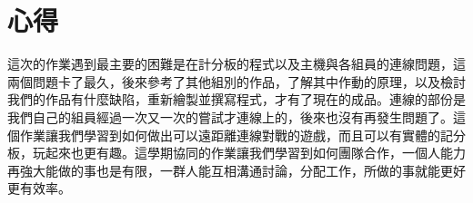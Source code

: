 \chapter{心得}
這次的作業遇到最主要的困難是在計分板的程式以及主機與各組員的連線問題，這兩個問題卡了最久，後來參考了其他組別的作品，了解其中作動的原理，以及檢討我們的作品有什麼缺陷，重新繪製並撰寫程式，才有了現在的成品。連線的部份是我們自己的組員經過一次又一次的嘗試才連線上的，後來也沒有再發生問題了。這個作業讓我們學習到如何做出可以遠距離連線對戰的遊戲，而且可以有實體的記分板，玩起來也更有趣。這學期協同的作業讓我們學習到如何團隊合作，一個人能力再強大能做的事也是有限，一群人能互相溝通討論，分配工作，所做的事就能更好更有效率。\\
\newpage
